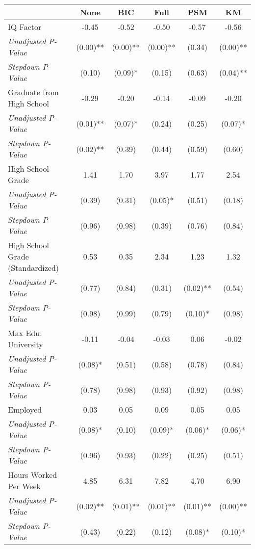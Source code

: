 \begin{tabular}{l c c c c c}
\toprule

 & None & BIC & Full & PSM & KM \\
\midrule
IQ Factor & -0.45 & -0.52 & -0.50 & -0.57 & -0.56 \\
\quad \textit{Unadjusted P-Value} & (0.00)** & (0.00)** & (0.00)** & (0.34) & (0.00)** \\
\quad \textit{Stepdown P-Value} & (0.10) & (0.09)* & (0.15) & (0.63) & (0.04)** \\
Graduate from High School & -0.29 & -0.20 & -0.14 & -0.09 & -0.20 \\
\quad \textit{Unadjusted P-Value} & (0.01)** & (0.07)* & (0.24) & (0.25) & (0.07)* \\
\quad \textit{Stepdown P-Value} & (0.02)** & (0.39) & (0.44) & (0.59) & (0.60) \\
High School Grade & 1.41 & 1.70 & 3.97 & 1.77 & 2.54 \\
\quad \textit{Unadjusted P-Value} & (0.39) & (0.31) & (0.05)* & (0.51) & (0.18) \\
\quad \textit{Stepdown P-Value} & (0.96) & (0.98) & (0.39) & (0.76) & (0.84) \\
High School Grade (Standardized) & 0.53 & 0.35 & 2.34 & 1.23 & 1.32 \\
\quad \textit{Unadjusted P-Value} & (0.77) & (0.84) & (0.31) & (0.02)** & (0.54) \\
\quad \textit{Stepdown P-Value} & (0.98) & (0.99) & (0.79) & (0.10)* & (0.98) \\
Max Edu: University & -0.11 & -0.04 & -0.03 & 0.06 & -0.02 \\
\quad \textit{Unadjusted P-Value} & (0.08)* & (0.51) & (0.58) & (0.78) & (0.84) \\
\quad \textit{Stepdown P-Value} & (0.78) & (0.98) & (0.93) & (0.92) & (0.98) \\
Employed & 0.03 & 0.05 & 0.09 & 0.05 & 0.05 \\
\quad \textit{Unadjusted P-Value} & (0.08)* & (0.10) & (0.09)* & (0.06)* & (0.06)* \\
\quad \textit{Stepdown P-Value} & (0.96) & (0.93) & (0.22) & (0.25) & (0.51) \\
Hours Worked Per Week & 4.85 & 6.31 & 7.82 & 4.70 & 6.90 \\
\quad \textit{Unadjusted P-Value} & (0.02)** & (0.01)** & (0.01)** & (0.01)** & (0.00)** \\
\quad \textit{Stepdown P-Value} & (0.43) & (0.22) & (0.12) & (0.08)* & (0.10)* \\

\end{tabular}
